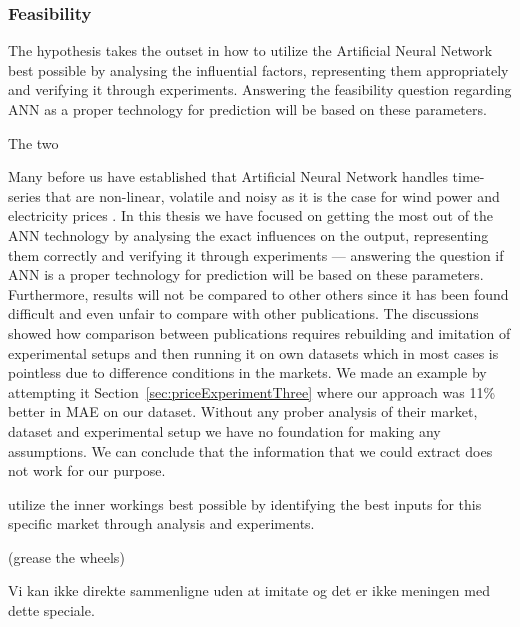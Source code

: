 \subsubsection{Feasibility}
The hypothesis takes the outset in how to utilize the Artificial Neural Network best possible by analysing the influential factors, representing them appropriately and verifying it through experiments. Answering the feasibility question regarding ANN as a proper technology for prediction will be based on these parameters.

The two 


Many before us have established that Artificial Neural Network handles time-series that are non-linear, volatile and noisy as it is the case for wind power and electricity prices \cite{stockForecasting,pjmForecast,yamin2004adaptive,windForecastPortugal}. In this thesis we have focused on getting the most out of the ANN technology by analysing the exact influences on the output, representing them correctly and verifying it through experiments --- answering the question if ANN is a proper technology for prediction will be based on these parameters. Furthermore, results will not be compared to other others since it has been found difficult and even unfair to compare with other publications. The discussions showed how comparison between publications requires rebuilding and imitation of experimental setups and then running it on own datasets which in most cases is pointless due to difference conditions in the markets. We made an example by attempting it Section~\ref{sec:priceExperimentThree} where our approach was 11\% better in MAE on our dataset. Without any prober analysis of their market, dataset and experimental setup we have no foundation for making any assumptions. We can conclude that the information that we could extract does not work for our purpose.  

utilize the inner workings best possible by identifying the best inputs for this specific market through analysis and experiments.

(grease the wheels)


Vi kan ikke direkte sammenligne uden at imitate og det er ikke meningen med dette speciale.


